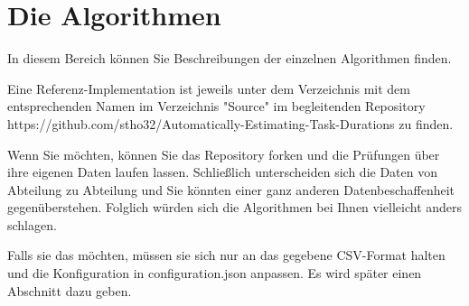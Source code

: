 \newpage{}

\section{Die Algorithmen}

In diesem Bereich können Sie Beschreibungen der einzelnen Algorithmen finden.

Eine Referenz-Implementation ist jeweils unter dem Verzeichnis mit dem entsprechenden
Namen im Verzeichnis "Source" im begleitenden Repository https://github.com/stho32/Automatically-Estimating-Task-Durations 
zu finden.

Wenn Sie möchten, können Sie das Repository forken und die Prüfungen über ihre 
eigenen Daten laufen lassen.
Schließlich unterscheiden sich die Daten von Abteilung zu Abteilung und Sie könnten einer ganz
anderen Datenbeschaffenheit gegenüberstehen.
Folglich würden sich die Algorithmen bei Ihnen vielleicht anders schlagen.

Falls sie das möchten, müssen sie sich nur an das gegebene CSV-Format halten und die 
Konfiguration in configuration.json anpassen. 
Es wird später einen Abschnitt dazu geben.

